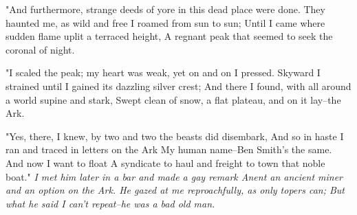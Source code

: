 \begin{poemblock}
 "And furthermore, strange deeds of yore in this dead place were done.
 They haunted me, as wild and free I roamed from sun to sun;
 Until I came where sudden flame uplit a terraced height,
 A regnant peak that seemed to seek the coronal of night.

 "I scaled the peak; my heart was weak, yet on and on I pressed.
 Skyward I strained until I gained its dazzling silver crest;
 And there I found, with all around a world supine and stark,
 Swept clean of snow, a flat plateau, and on it lay--the Ark.

 "Yes, there, I knew, by two and two the beasts did disembark,
 And so in haste I ran and traced in letters on the Ark
 My human name--Ben Smith's the same.  And now I want to float
 A syndicate to haul and freight to town that noble boat."
\textit{
  I met him later in a bar and made a gay remark
  Anent an ancient miner and an option on the Ark.
  He gazed at me reproachfully, as only topers can;
  But what he said I can't repeat--he was a bad old man.
}

\end{poemblock}
